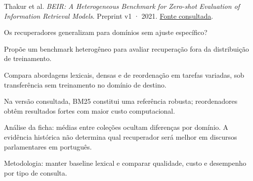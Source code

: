 {\small Thakur et al. \textit{{BEIR}: A Heterogeneous Benchmark for Zero-shot Evaluation of Information Retrieval Models}. Preprint v1 · 2021. \href{https://arxiv.org/pdf/2104.08663v1}{Fonte consultada}.\par}

Os recuperadores generalizam para domínios sem ajuste específico?

Propõe um benchmark heterogêneo para avaliar recuperação fora da distribuição de treinamento.

Compara abordagens lexicais, densas e de reordenação em tarefas variadas, sob transferência sem treinamento no domínio de destino.

Na versão consultada, BM25 constitui uma referência robusta; reordenadores obtêm resultados fortes com maior custo computacional.

\begin{itemize}
\end{itemize}

Análise da ficha: médias entre coleções ocultam diferenças por domínio. A evidência histórica não determina qual recuperador será melhor em discursos parlamentares em português.

Metodologia: manter baseline lexical e comparar qualidade, custo e desempenho por tipo de consulta.

